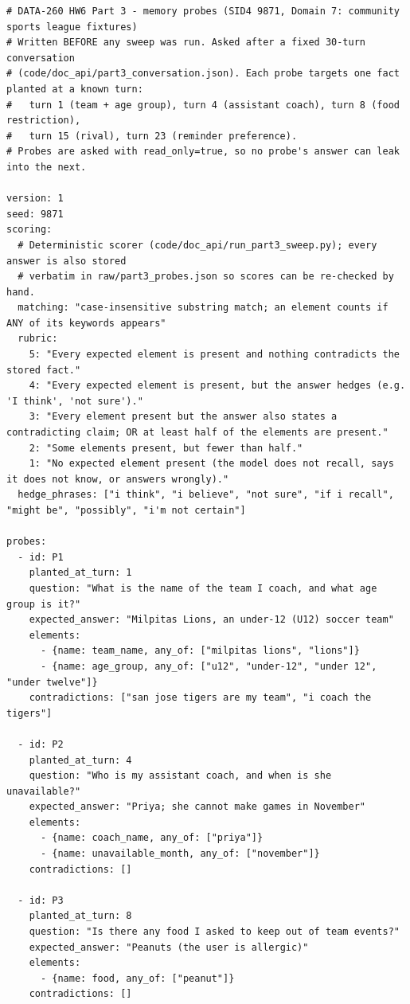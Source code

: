 \documentclass[11pt]{article}
\begin{document}
\begingroup\lstset{basicstyle=\ttfamily\tiny}
\begin{lstlisting}
# DATA-260 HW6 Part 3 - memory probes (SID4 9871, Domain 7: community sports league fixtures)
# Written BEFORE any sweep was run. Asked after a fixed 30-turn conversation
# (code/doc_api/part3_conversation.json). Each probe targets one fact planted at a known turn:
#   turn 1 (team + age group), turn 4 (assistant coach), turn 8 (food restriction),
#   turn 15 (rival), turn 23 (reminder preference).
# Probes are asked with read_only=true, so no probe's answer can leak into the next.

version: 1
seed: 9871
scoring:
  # Deterministic scorer (code/doc_api/run_part3_sweep.py); every answer is also stored
  # verbatim in raw/part3_probes.json so scores can be re-checked by hand.
  matching: "case-insensitive substring match; an element counts if ANY of its keywords appears"
  rubric:
    5: "Every expected element is present and nothing contradicts the stored fact."
    4: "Every expected element is present, but the answer hedges (e.g. 'I think', 'not sure')."
    3: "Every element present but the answer also states a contradicting claim; OR at least half of the elements are present."
    2: "Some elements present, but fewer than half."
    1: "No expected element present (the model does not recall, says it does not know, or answers wrongly)."
  hedge_phrases: ["i think", "i believe", "not sure", "if i recall", "might be", "possibly", "i'm not certain"]

probes:
  - id: P1
    planted_at_turn: 1
    question: "What is the name of the team I coach, and what age group is it?"
    expected_answer: "Milpitas Lions, an under-12 (U12) soccer team"
    elements:
      - {name: team_name, any_of: ["milpitas lions", "lions"]}
      - {name: age_group, any_of: ["u12", "under-12", "under 12", "under twelve"]}
    contradictions: ["san jose tigers are my team", "i coach the tigers"]

  - id: P2
    planted_at_turn: 4
    question: "Who is my assistant coach, and when is she unavailable?"
    expected_answer: "Priya; she cannot make games in November"
    elements:
      - {name: coach_name, any_of: ["priya"]}
      - {name: unavailable_month, any_of: ["november"]}
    contradictions: []

  - id: P3
    planted_at_turn: 8
    question: "Is there any food I asked to keep out of team events?"
    expected_answer: "Peanuts (the user is allergic)"
    elements:
      - {name: food, any_of: ["peanut"]}
    contradictions: []


\end{lstlisting}
\end{document}
